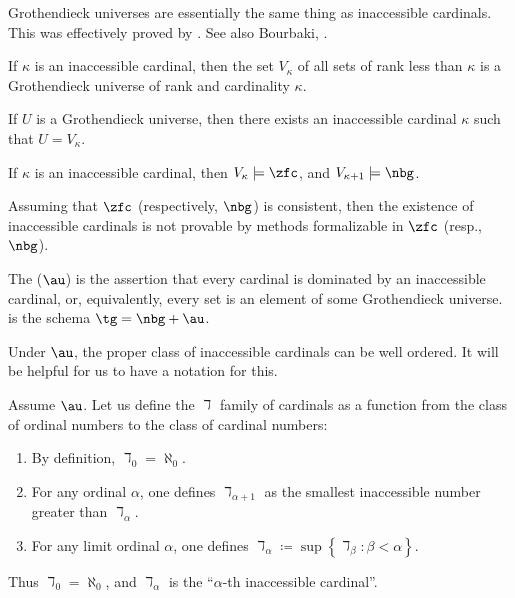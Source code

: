 Grothendieck universes are essentially the same thing as inaccessible cardinals.
This was effectively proved by \cite{Tarski1938}.
See also Bourbaki, \citeauthor[Exposé I, Appendix]{SGA4-1}.
\begin{proposition}
	If $\kappa$ is an inaccessible cardinal, then
	the set $V_{\kappa}$ of all sets of rank less than $\kappa$ is
	a Grothendieck universe of rank and cardinality $\kappa$.

	If $ U $ is a Grothendieck universe, then
	there exists an inaccessible cardinal $ \kappa $ such that $ U = V_{\kappa} $.
\end{proposition}

\begin{theorem}
	If $ \kappa $ is an inaccessible cardinal,
	then $V_{\kappa} \models \zfc $, and
	$ V_{\kappa+1} \models \nbg $.
	
	Assuming that $ \zfc $ (respectively, $ \nbg $) is consistent, then
	the existence of inaccessible cardinals is not provable
	by methods formalizable in $ \zfc $ (resp., $ \nbg $).
\end{theorem}

\begin{axiom}%
\label{axm:AU}
	The  ($ \au $) is the assertion that
	every cardinal is dominated by an inaccessible cardinal,
	or, equivalently, every set is an element of some Grothendieck universe.
	 is the schema $\tg = \nbg+\au$.
\end{axiom}

Under $ \au $, the proper class of inaccessible cardinals
can be well ordered.
It will be helpful for us to have a notation for this.

\begin{definition}
	Assume $ \au $.
	Let us define the $ \daleth $ family of cardinals
	as a function from the class of ordinal numbers
	to the class of cardinal numbers:
	\begin{enumerate}
		\item By definition, $ \daleth_0 = \aleph_0 $.
		\item For any ordinal $ \alpha $,
			one defines $ \daleth_{\alpha+1} $ as
			the smallest inaccessible number
			greater than $ \daleth_{\alpha} $.
		\item For any limit ordinal $ \alpha $,
			one defines
			$ \daleth_{\alpha} \coloneq \sup \left\{ \daleth_{\beta} :
			\beta < \alpha \right\} $.
	\end{enumerate}
	Thus $ \daleth_0 = \aleph_0 $, and
	$ \daleth_{\alpha} $ is the
	\enquote{$ \alpha $-th inaccessible cardinal}.
\end{definition}

